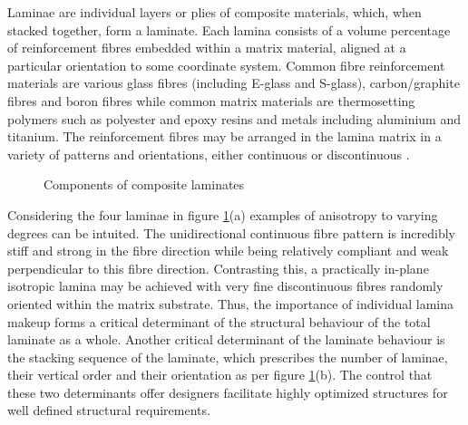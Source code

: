 Laminae are individual layers or plies of composite materials, which, when stacked together, form a laminate. Each lamina consists of a volume percentage of reinforcement fibres embedded within a matrix material, aligned at a particular orientation to some coordinate system. Common fibre reinforcement materials are various glass fibres (including E-glass and S-glass), carbon/graphite fibres and boron fibres while common matrix materials are thermosetting polymers such as polyester and epoxy resins and metals including aluminium and titanium. The reinforcement fibres may be arranged in the lamina matrix in a variety of patterns and orientations, either continuous or discontinuous \cite{agarwal2006analysis}. 
\begin{figure}[H]
	\caption{\label{composite_laminates}Components of composite laminates \cite{reddy2004mechanics}}
\end{figure}

Considering the four laminae in figure \ref{composite_laminates}(a) examples of anisotropy to varying degrees can be intuited. The unidirectional continuous fibre pattern is incredibly stiff and strong in the fibre direction while being relatively compliant and weak  perpendicular to this fibre direction. Contrasting this, a practically in-plane isotropic lamina may be achieved with very fine discontinuous fibres randomly oriented within the matrix substrate. Thus, the importance of individual lamina makeup forms a critical determinant of the structural behaviour of the total laminate as a whole. Another critical determinant of the laminate behaviour is the stacking sequence of the laminate, which prescribes the number of laminae, their vertical order and their orientation as per figure \ref{composite_laminates}(b). The control that these two determinants offer designers facilitate highly optimized structures for well defined structural requirements.


